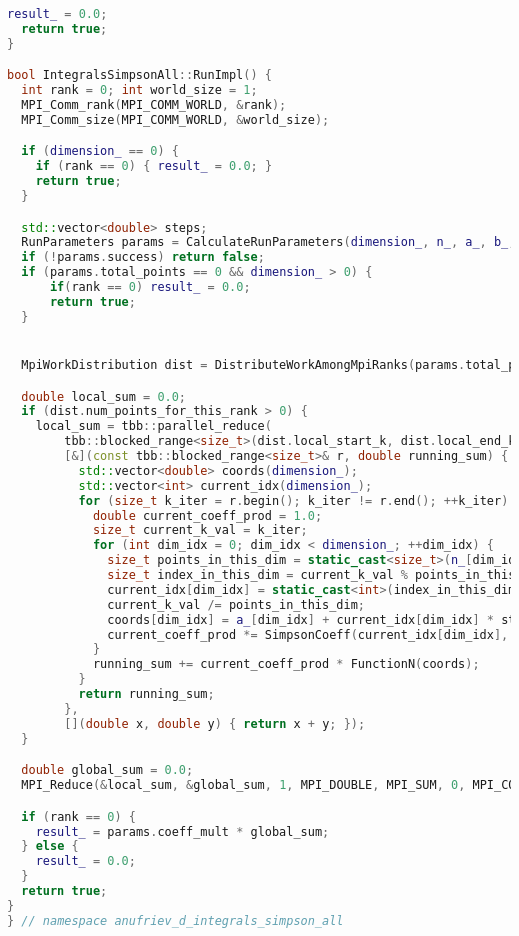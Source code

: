 \documentclass[a4paper,12pt]{article}
\begin{document}
\begin{lstlisting}[language=C++, caption=Ключевые функции из ops\_all.cpp, basicstyle=\ttfamily\tiny]
  result_ = 0.0;
  return true;
}

bool IntegralsSimpsonAll::RunImpl() {
  int rank = 0; int world_size = 1;
  MPI_Comm_rank(MPI_COMM_WORLD, &rank);
  MPI_Comm_size(MPI_COMM_WORLD, &world_size);

  if (dimension_ == 0) {
    if (rank == 0) { result_ = 0.0; }
    return true;
  }

  std::vector<double> steps; 
  RunParameters params = CalculateRunParameters(dimension_, n_, a_, b_, steps);
  if (!params.success) return false;
  if (params.total_points == 0 && dimension_ > 0) {
      if(rank == 0) result_ = 0.0;
      return true;
  }


  MpiWorkDistribution dist = DistributeWorkAmongMpiRanks(params.total_points, rank, world_size);

  double local_sum = 0.0;
  if (dist.num_points_for_this_rank > 0) {
    local_sum = tbb::parallel_reduce(
        tbb::blocked_range<size_t>(dist.local_start_k, dist.local_end_k), 0.0,
        [&](const tbb::blocked_range<size_t>& r, double running_sum) {
          std::vector<double> coords(dimension_);
          std::vector<int> current_idx(dimension_);
          for (size_t k_iter = r.begin(); k_iter != r.end(); ++k_iter) {
            double current_coeff_prod = 1.0;
            size_t current_k_val = k_iter;
            for (int dim_idx = 0; dim_idx < dimension_; ++dim_idx) {
              size_t points_in_this_dim = static_cast<size_t>(n_[dim_idx]) + 1;
              size_t index_in_this_dim = current_k_val % points_in_this_dim;
              current_idx[dim_idx] = static_cast<int>(index_in_this_dim);
              current_k_val /= points_in_this_dim;
              coords[dim_idx] = a_[dim_idx] + current_idx[dim_idx] * steps[dim_idx];
              current_coeff_prod *= SimpsonCoeff(current_idx[dim_idx], n_[dim_idx]);
            }
            running_sum += current_coeff_prod * FunctionN(coords);
          }
          return running_sum;
        },
        [](double x, double y) { return x + y; });
  }

  double global_sum = 0.0;
  MPI_Reduce(&local_sum, &global_sum, 1, MPI_DOUBLE, MPI_SUM, 0, MPI_COMM_WORLD);

  if (rank == 0) {
    result_ = params.coeff_mult * global_sum;
  } else {
    result_ = 0.0; 
  }
  return true;
}
} // namespace anufriev_d_integrals_simpson_all
\end{lstlisting}
\end{document}
